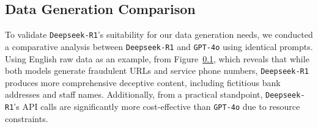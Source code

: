 \subsection{Data Generation Comparison}
\label{app:Data Generation Comparison}
To validate \texttt{Deepseek-R1}'s suitability for our data generation needs, we conducted a comparative analysis between \texttt{Deepseek-R1} and \texttt{GPT-4o} using identical prompts. Using English raw data as an example, from Figure~\ref{app:Data Generation Comparison}, which reveals that while both models generate fraudulent URLs and service phone numbers, \texttt{Deepseek-R1} produces more comprehensive deceptive content, including fictitious bank addresses and staff names. Additionally, from a practical standpoint, \texttt{Deepseek-R1}'s API calls are significantly more cost-effective than \texttt{GPT-4o} due to resource constraints.

\newpage
